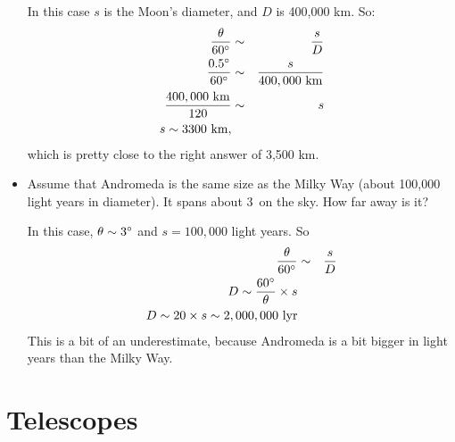 \documentclass[12pt, preprint]{aastex}
\begin{document}
\begin{itemize}
    \begin{answer}
      In this case $s$ is the Moon's diameter, and $D$ is 400,000
      km. So:
      \begin{eqnarray}
        \frac{\theta}{60{}^\circ} &\sim& \frac{s}{D} \cr
        \frac{0.5 {}^\circ}{60{}^\circ} &\sim& \frac{s}{400,000 {\rm
            ~km}} \cr
        \frac{400,000 {\rm ~km}}{120} &\sim& s \cr
        s \sim 3300 {\rm ~km},
      \end{eqnarray}
      which is pretty close to the right answer of 3,500 km.
    \end{answer}
  \item Assume that Andromeda is the same size as the Milky Way (about
    100,000 light years in diameter). It spans about 3\degree\ on the
    sky. How far away is it?

    \begin{answer}
      In this case, $\theta\sim 3{}^\circ$ and $s=100,000$ light
      years. So
      \begin{eqnarray}
        \frac{\theta}{60{}^\circ} &\sim& \frac{s}{D} \cr
        D \sim \frac{60{}^\circ}{\theta} \times s \cr
        D \sim 20 \times s \sim 2,000,000 {\rm ~lyr}\cr
      \end{eqnarray}
      This is a bit of an underestimate, because Andromeda is a bit
      bigger in light years than the Milky Way.
    \end{answer}
\end{itemize}

\section{Telescopes}
\end{document}
